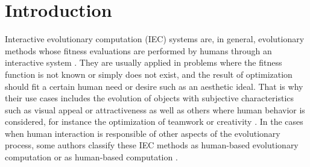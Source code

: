 \section{Introduction}




Interactive evolutionary computation (IEC) systems are, in general, evolutionary methods
whose fitness evaluations are performed by humans through an interactive 
system \cite{eiben2015interactive}.
They are usually applied in problems where the fitness function is not known or simply
does not exist, and the result of optimization should fit a certain human need or desire such as an aesthetic ideal.  
That is why their use cases includes the evolution of objects with subjective characteristics
such as visual appeal or attractiveness \cite{biomorphs} as well as others where human behavior is 
considered, for instance the optimization of teamwork \cite{kosorukoff2002evolutionary}
or creativity \cite{yu2011cooks}. In the cases when 
human interaction is responsible of other 
aspects of the evolutionary process, some authors classify these IEC methods 
as human-based evolutionary computation \cite{kosorukoff2001human} 
or as human-based computation \cite{quinn2011human}.

